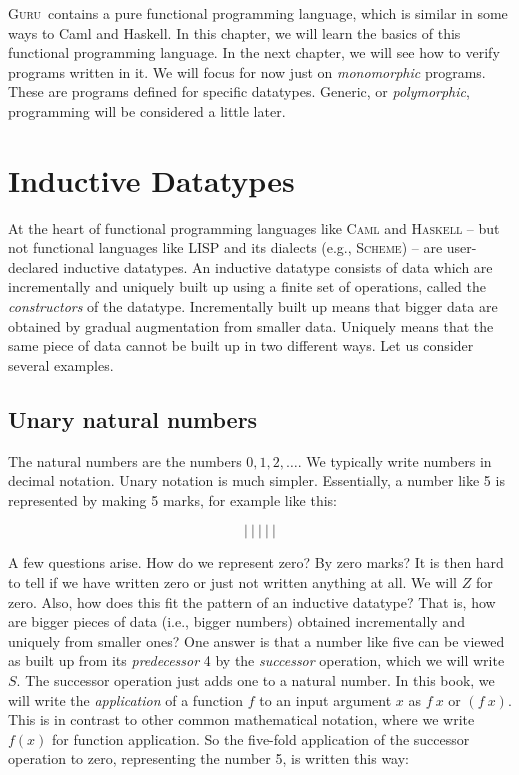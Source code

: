 \documentclass{book}[12pt]
\newcommand{\guru}[0]{\textsc{Guru}}
\begin{document}
\guru\ contains a pure functional programming language, which is
similar in some ways to Caml and Haskell.  In this chapter, we will
learn the basics of this functional programming language.  In the next
chapter, we will see how to verify programs written in it.  We will
focus for now just on \emph{monomorphic} programs.  These are programs
defined for specific datatypes.  Generic, or \emph{polymorphic},
programming will be considered a little later.

\section{Inductive Datatypes}

At the heart of functional programming languages like \textsc{Caml}
and \textsc{Haskell} -- but not functional languages like
\textsc{LISP} and its dialects (e.g., \textsc{Scheme}) -- are
user-declared inductive datatypes.  An inductive datatype consists of
data which are incrementally and uniquely built up using a finite set
of operations, called the \emph{constructors} of the datatype.
Incrementally built up means that bigger data are obtained by gradual
augmentation from smaller data.  Uniquely means that the same piece of
data cannot be built up in two different ways.  Let us consider
several examples.

\subsection{Unary natural numbers}

The natural numbers are the numbers $0,1,2,\ldots$.  We typically
write numbers in decimal notation.  Unary notation is much simpler.
Essentially, a number like 5 is represented by making 5 marks, for
example like this:

\[ |\ |\ |\ |\ | \]

\noindent A few questions arise.  How do we represent zero?  By zero
marks?  It is then hard to tell if we have written zero or just not
written anything at all.  We will $Z$ for zero.  Also, how does this
fit the pattern of an inductive datatype?  That is, how are bigger
pieces of data (i.e., bigger numbers) obtained incrementally and
uniquely from smaller ones?  One answer is that a number like five can
be viewed as built up from its \emph{predecessor} 4 by the
\emph{successor} operation, which we will write $S$.  The successor
operation just adds one to a natural number.  In this book, we will
write the \emph{application} of a function $f$ to an input argument
$x$ as $f\ x$ or $(f\ x)$.  This is in contrast to other common
mathematical notation, where we write $f(x)$ for function application.
So the five-fold application of the successor operation to zero,
representing the number 5, is written this way:
\end{document}
